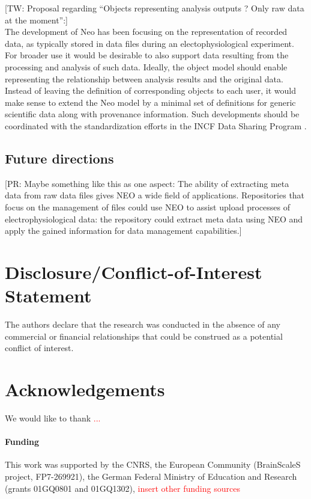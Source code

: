 \documentclass{frontiers}
\newcommand{\missing}[1]{\textcolor{red}{#1}}
\newcommand{\thomas}[1]{[\textcolor{Emerald}{TW: #1}]}
\newcommand{\philipp}[1]{[\textcolor{YellowOrange}{PR: #1}]}
\begin{document}
\thomas{Proposal regarding ``Objects representing analysis outputs ? Only raw data at the moment'':}\\
The development of Neo has been focusing on the representation of recorded data, as typically stored in data files during an electophysiological experiment.
For broader use it would be desirable to also support data resulting from the processing and analysis of such data.
Ideally, the object model should enable representing the relationship between analysis results and the original data.
Instead of leaving the definition of corresponding objects to each user, it would make sense to extend the Neo model by a minimal set of definitions for generic scientific data along with provenance information.
Such developments should be coordinated with the standardization efforts in the INCF Data Sharing Program \citep{Teeters2013}.



\subsection{Future directions}

\philipp{Maybe something like this as one aspect: The ability of extracting
meta data from raw data files gives NEO a wide field of applications.
Repositories that focus on the management of files could use NEO to assist
upload processes of electrophysiological data: the repository could extract
meta data using NEO and apply the gained information for data management
capabilities.}

\section*{Disclosure/Conflict-of-Interest Statement}
The authors declare that the research was conducted in the absence of any commercial or financial relationships that could be construed as a potential conflict of interest.

\section*{Acknowledgements}
We would like to thank \missing{...}

\paragraph{Funding\textcolon} This work was supported by the CNRS, the European Community (BrainScaleS project, FP7-269921),
the German Federal Ministry of Education and Research (grants 01GQ0801 and 01GQ1302),
\missing{insert other funding sources}



\end{document}
